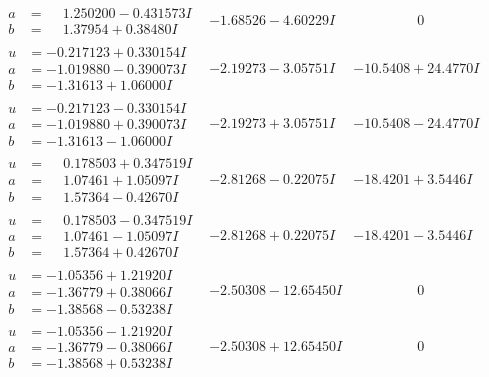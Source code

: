 \documentclass[1p]{elsarticle_modified}
\theoremstyle{definition}
\begin{document}
$$\begin{array}{c|c|c}
\begin{aligned}
a &= \phantom{-}1.250200 - 0.431573 I \\
b &= \phantom{-}1.37954 + 0.38480 I\end{aligned}
 & -1.68526 - 4.60229 I & \phantom{-0.000000 } 0 \\ \hline\begin{aligned}
u &= -0.217123 + 0.330154 I \\
a &= -1.019880 - 0.390073 I \\
b &= -1.31613 + 1.06000 I\end{aligned}
 & -2.19273 - 3.05751 I & -10.5408 + 24.4770 I \\ \hline\begin{aligned}
u &= -0.217123 - 0.330154 I \\
a &= -1.019880 + 0.390073 I \\
b &= -1.31613 - 1.06000 I\end{aligned}
 & -2.19273 + 3.05751 I & -10.5408 - 24.4770 I \\ \hline\begin{aligned}
u &= \phantom{-}0.178503 + 0.347519 I \\
a &= \phantom{-}1.07461 + 1.05097 I \\
b &= \phantom{-}1.57364 - 0.42670 I\end{aligned}
 & -2.81268 - 0.22075 I & -18.4201 + 3.5446 I \\ \hline\begin{aligned}
u &= \phantom{-}0.178503 - 0.347519 I \\
a &= \phantom{-}1.07461 - 1.05097 I \\
b &= \phantom{-}1.57364 + 0.42670 I\end{aligned}
 & -2.81268 + 0.22075 I & -18.4201 - 3.5446 I \\ \hline\begin{aligned}
u &= -1.05356 + 1.21920 I \\
a &= -1.36779 + 0.38066 I \\
b &= -1.38568 - 0.53238 I\end{aligned}
 & -2.50308 - 12.65450 I & \phantom{-0.000000 } 0 \\ \hline\begin{aligned}
u &= -1.05356 - 1.21920 I \\
a &= -1.36779 - 0.38066 I \\
b &= -1.38568 + 0.53238 I\end{aligned}
 & -2.50308 + 12.65450 I & \phantom{-0.000000 } 0 \\ \hline\begin{aligned}

\end{aligned}
\end{array}$$
\end{document}
